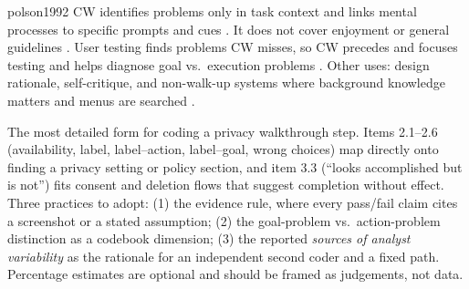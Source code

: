 \begin{papercard}{polson1992}
 CW identifies problems only in task context and links mental processes to specific prompts and cues . It does not cover enjoyment or general guidelines . User testing finds problems CW misses, so CW precedes and focuses testing and helps diagnose goal vs.\ execution problems . Other uses: design rationale, self-critique, and non-walk-up systems where background knowledge matters and menus are searched .

 The most detailed form for coding a privacy walkthrough step. Items 2.1--2.6 (availability, label, label--action, label--goal, wrong choices) map directly onto finding a privacy setting or policy section, and item 3.3 (``looks accomplished but is not'') fits consent and deletion flows that suggest completion without effect. Three practices to adopt: (1) the evidence rule, where every pass/fail claim cites a screenshot or a stated assumption; (2) the goal-problem vs.\ action-problem distinction as a codebook dimension; (3) the reported \emph{sources of analyst variability} as the rationale for an independent second coder and a fixed path. Percentage estimates are optional and should be framed as judgements, not data.
\end{papercard}
